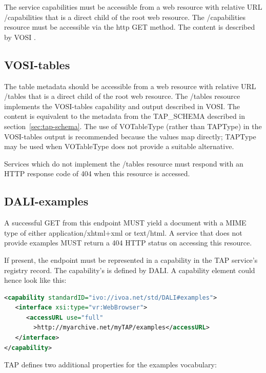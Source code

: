 \documentclass[11pt,letter]{ivoa}
\newcommand{\tapschema}{TAP\_SCHE\-MA}
\newcommand{\tapschema}{\mbox{%
  \relsize{-0.5}TAP\discretionary{-}{}{\kern-2pt\_}SCHEMA}}
\begin{document}
The service capabilities must be accessible from a web resource with relative 
URL /capabilities that is a direct child of the root web resource. The 
/capabilities resource must be accessible via the http GET method. The content 
is described by VOSI \citep{2017ivoa.spec.0524G}.

\subsection{VOSI-tables}
\label{sec:vosi-tables}

The table metadata should be accessible from a web resource with relative URL 
/tables that is a direct child of the root web resource. The /tables resource 
implements the VOSI-tables capability and output described in VOSI.
The content is equivalent to the metadata from the 
\tapschema{} described in section~\ref{sec:tap-schema}. The use of VOTableType 
(rather than TAPType) in the VOSI-tables output  is recommended because the values 
map directly; TAPType may be used when VOTableType does not provide a suitable
alternative.

Services which do not implement the /tables resource must respond with an HTTP 
response code of 404 when this resource is accessed.

\subsection{DALI-examples}
\label{sec:dali-examples}

A successful GET from this endpoint MUST yield a document with a MIME type of either 
application/xhtml+xml or text/html. A service that does not provide examples 
MUST return a 404 HTTP status on accessing this resource.

If present, the endpoint must be represented in a capability in the TAP 
service's registry record. The capability's  is defined by
DALI. A capability element could hence look like this:

\begin{lstlisting}[language=XML,basicstyle=\footnotesize]
<capability standardID="ivo://ivoa.net/std/DALI#examples">
   <interface xsi:type="vr:WebBrowser">
      <accessURL use="full"
        >http://myarchive.net/myTAP/examples</accessURL>
   </interface>
</capability>
\end{lstlisting}

TAP defines two additional properties for the examples vocabulary:
\end{document}
